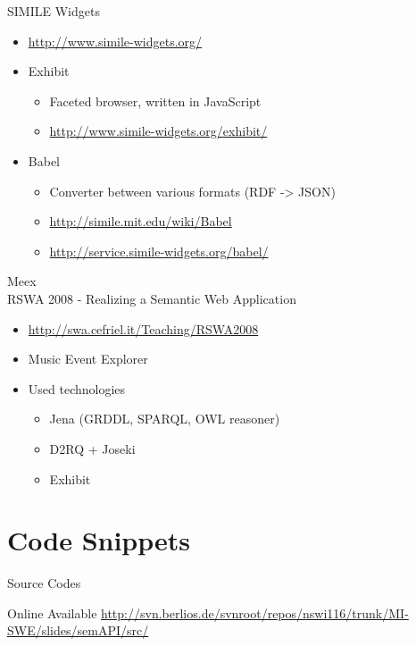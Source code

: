 \documentclass[xcolor=dvipsnames]{beamer}
\begin{document}
\begin{frame}{SIMILE Widgets}
\begin{itemize}
	\item \url{http://www.simile-widgets.org/}
	\item Exhibit
		\begin{itemize}
			\item Faceted browser, written in JavaScript
			\item \url{http://www.simile-widgets.org/exhibit/} 
		\end{itemize}
	\item Babel
		\begin{itemize}
			\item Converter between various formats (RDF -> JSON)
			\item \url{http://simile.mit.edu/wiki/Babel} 
			\item \url{http://service.simile-widgets.org/babel/} 
		\end{itemize}
\end{itemize}
\end{frame}

\begin{frame}{Meex\\RSWA 2008 - Realizing a Semantic Web Application}

\begin{itemize}
	\item \url{http://swa.cefriel.it/Teaching/RSWA2008}
	\item Music Event Explorer
	\item Used technologies
		\begin{itemize}
			\item Jena (GRDDL, SPARQL, OWL reasoner)
			\item D2RQ + Joseki
			\item Exhibit
		\end{itemize}
\end{itemize}
\end{frame}

\section{Code Snippets}

\begin{frame}{Source Codes}
\begin{block}{Online Available}
\medskip
\scriptsize\url{http://svn.berlios.de/svnroot/repos/nswi116/trunk/MI-SWE/slides/semAPI/src/}
\medskip
\end{block}	
\end{frame}
\end{document}
